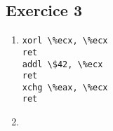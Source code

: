 \subsection{Exercice 3}

\begin{enumerate}
\item
\begin{lstlisting}
xorl \%ecx, \%ecx
ret
addl \$42, \%ecx
ret
xchg \%eax, \%ecx
ret
\end{lstlisting}
\item
\end{enumerate}
